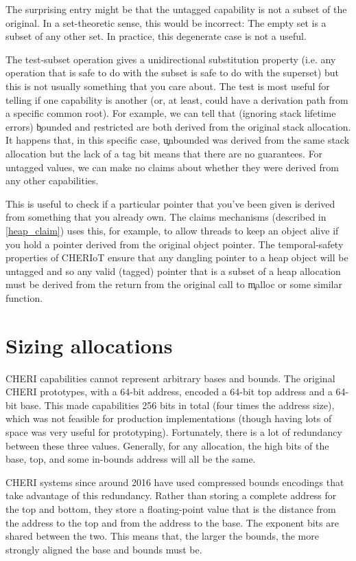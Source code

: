 {{{{{{{{The surprising entry might be that the untagged capability is not a subset of the original.
In a set-theoretic sense, this would be incorrect: The empty set is a subset of any other set.
In practice, this degenerate case is not a useful.

The test-subset operation gives a unidirectional substitution property (i.e. any operation that is safe to do with the subset is safe to do with the superset) but this is not usually something that you care about.
The test is most useful for telling if one capability is  another (or, at least, could have a derivation path from a specific common root).
For example, we can tell that (ignoring stack lifetime errors) \c{bounded} and \c{restricted} are both derived from the original stack allocation.
It happens that, in this specific case, \c{unbounded} was derived from the same stack allocation but the lack of a tag bit means that there are no  guarantees.
For untagged values, we can make no claims about whether they were derived from any other capabilities.

This is useful to check if a particular pointer that you've been given is derived from something that you already own.
The claims mechanisms (described in \ref{heap_claim}) uses this, for example, to allow threads to keep an object alive if you hold a pointer derived from the original object pointer.
The temporal-safety properties of CHERIoT ensure that any dangling pointer to a heap object will be untagged and so any valid (tagged) pointer that is a subset of a heap allocation must be derived from the return from the original call to \c{malloc} or some similar function.

\section{Sizing allocations}

CHERI capabilities cannot represent arbitrary bases and bounds.
The original CHERI prototypes, with a 64-bit address, encoded a 64-bit top address and a 64-bit base.
This made capabilities 256 bits in total (four times the address size), which was not feasible for production implementations (though having lots of space was very useful for prototyping).
Fortunately, there is a lot of redundancy between these three values.
Generally, for any allocation, the high bits of the base, top, and some in-bounds address will all be the same.

CHERI systems since around 2016 have used compressed bounds encodings that take advantage of this redundancy.
Rather than storing a complete address for the top and bottom, they store a floating-point value that is the distance from the address to the top and from the address to the base.
The exponent bits are shared between the two.
This means that, the larger the bounds, the more strongly aligned the base and bounds must be.

}}}}}}}}
